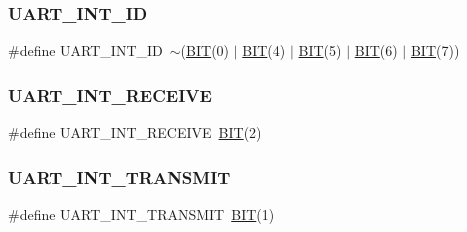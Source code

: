 \mbox{\label{group__uart_gaa922cdff3dcfeaa00a4999478e5dfa7b}} 
\subsubsection{\texorpdfstring{U\+A\+R\+T\+\_\+\+I\+N\+T\+\_\+\+ID}{UART\_INT\_ID}}
{\footnotesize\ttfamily \#define U\+A\+R\+T\+\_\+\+I\+N\+T\+\_\+\+ID~$\sim$(\mbox{\hyperlink{group__uart_ga3a8ea58898cb58fc96013383d39f482c}{B\+IT}}(0) $\vert$ \mbox{\hyperlink{group__uart_ga3a8ea58898cb58fc96013383d39f482c}{B\+IT}}(4) $\vert$ \mbox{\hyperlink{group__uart_ga3a8ea58898cb58fc96013383d39f482c}{B\+IT}}(5) $\vert$ \mbox{\hyperlink{group__uart_ga3a8ea58898cb58fc96013383d39f482c}{B\+IT}}(6) $\vert$ \mbox{\hyperlink{group__uart_ga3a8ea58898cb58fc96013383d39f482c}{B\+IT}}(7))}

\mbox{\label{group__uart_ga6015454531962e33f218b55894057f72}} 
\subsubsection{\texorpdfstring{U\+A\+R\+T\+\_\+\+I\+N\+T\+\_\+\+R\+E\+C\+E\+I\+VE}{UART\_INT\_RECEIVE}}
{\footnotesize\ttfamily \#define U\+A\+R\+T\+\_\+\+I\+N\+T\+\_\+\+R\+E\+C\+E\+I\+VE~\mbox{\hyperlink{group__uart_ga3a8ea58898cb58fc96013383d39f482c}{B\+IT}}(2)}

\mbox{\label{group__uart_gaed19a27cced295d66161cc6bb3605d88}} 
\subsubsection{\texorpdfstring{U\+A\+R\+T\+\_\+\+I\+N\+T\+\_\+\+T\+R\+A\+N\+S\+M\+IT}{UART\_INT\_TRANSMIT}}
{\footnotesize\ttfamily \#define U\+A\+R\+T\+\_\+\+I\+N\+T\+\_\+\+T\+R\+A\+N\+S\+M\+IT~\mbox{\hyperlink{group__uart_ga3a8ea58898cb58fc96013383d39f482c}{B\+IT}}(1)}

